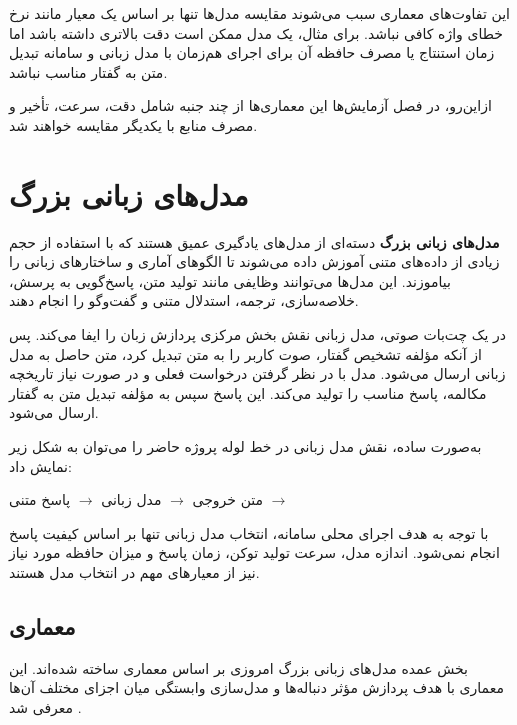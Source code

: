 این تفاوت‌های معماری سبب می‌شوند مقایسه مدل‌ها تنها بر اساس
یک معیار مانند نرخ خطای واژه کافی نباشد.
برای مثال، یک مدل ممکن است دقت بالاتری داشته باشد اما زمان
استنتاج یا مصرف حافظه آن برای اجرای هم‌زمان با مدل زبانی و
سامانه تبدیل متن به گفتار مناسب نباشد.

ازاین‌رو، در فصل آزمایش‌ها این معماری‌ها از چند جنبه شامل
دقت، سرعت، تأخیر و مصرف منابع با یکدیگر مقایسه خواهند شد.

\section{مدل‌های زبانی بزرگ}

\textbf{مدل‌های زبانی بزرگ}
دسته‌ای از مدل‌های یادگیری عمیق هستند که با استفاده از حجم زیادی
از داده‌های متنی آموزش داده می‌شوند تا الگوهای آماری و ساختارهای
زبانی را بیاموزند.
این مدل‌ها می‌توانند وظایفی مانند تولید متن، پاسخ‌گویی به پرسش،
خلاصه‌سازی، ترجمه، استدلال متنی و گفت‌وگو را انجام دهند.

در یک چت‌بات صوتی، مدل زبانی نقش بخش مرکزی پردازش زبان را ایفا
می‌کند.
پس از آنکه مؤلفه تشخیص گفتار، صوت کاربر را به متن تبدیل کرد،
متن حاصل به مدل زبانی ارسال می‌شود.
مدل با در نظر گرفتن درخواست فعلی و در صورت نیاز تاریخچه مکالمه،
پاسخ مناسب را تولید می‌کند.
این پاسخ سپس به مؤلفه تبدیل متن به گفتار ارسال می‌شود.

به‌صورت ساده، نقش مدل زبانی در خط لوله پروژه حاضر را می‌توان
به شکل زیر نمایش داد:

\begin{center}
متن خروجی 
$\longrightarrow$
مدل زبانی
$\longrightarrow$
پاسخ متنی
$\longrightarrow$
\end{center}

با توجه به هدف اجرای محلی سامانه، انتخاب مدل زبانی تنها بر اساس
کیفیت پاسخ انجام نمی‌شود.
اندازه مدل، سرعت تولید توکن، زمان پاسخ و میزان حافظه مورد نیاز
نیز از معیارهای مهم در انتخاب مدل هستند.


\subsection{معماری }

بخش عمده مدل‌های زبانی بزرگ امروزی بر اساس معماری
ساخته شده‌اند.
این معماری با هدف پردازش مؤثر دنباله‌ها و مدل‌سازی وابستگی میان
اجزای مختلف آن‌ها معرفی شد \cite{vaswani2017attention}.

